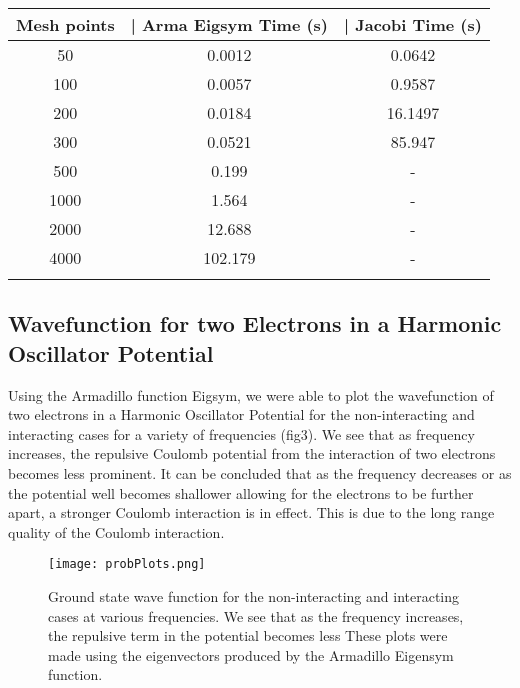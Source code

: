\documentclass[10pt,showpacs,preprintnumbers,amsmath,amssymb,aps,prl,twocolumn,groupedaddress,superscriptaddress,showkeys]{revtex4-1}
\begin{document}
\begin{center}
		\begin{tabular}{ccc}
		    \hline \hline
			Mesh points  &| Arma Eigsym Time (s) &| Jacobi Time (s)\\
			\hline
			50 	& 0.0012 & 0.0642 \\
			100 & 0.0057 & 0.9587	\\
			200 & 0.0184 & 16.1497\\
			300 & 0.0521 & 85.947\\	
			500 & 0.199  & -\\
			1000 & 1.564 & -\\
			2000 & 12.688 & -\\
			4000 &  102.179 & -\\
			\hline
			\label{timingtable}
		\end{tabular}
	\end{center}
\subsection{Wavefunction for two Electrons in a Harmonic Oscillator Potential}
Using the Armadillo function Eigsym, we were able to plot the wavefunction of two electrons in a Harmonic Oscillator Potential for the non-interacting and interacting cases for a variety of frequencies (fig3). We see that as frequency increases, the repulsive Coulomb potential from the interaction of two electrons becomes less prominent. It can be concluded that as the frequency decreases or as the potential well becomes shallower allowing for the electrons to be further apart, a stronger Coulomb interaction is in effect. This is due to the long range quality of the Coulomb interaction. 
\begin{widetext}
\begin{figure}[hbtp]
\texttt{[image: probPlots.png]}
\caption{Ground state wave function for the non-interacting and interacting cases at various frequencies. We see that as the frequency increases, the repulsive term in the potential becomes less These plots were made using the eigenvectors produced by the Armadillo Eigensym function.} 
\label{probability}
\end{figure}
\end{widetext}
\end{document}
